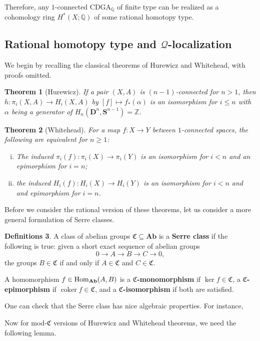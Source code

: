 \documentclass[psamsfonts]{amsart}
\newtheorem{thm}{Theorem}[section]
\theoremstyle{definition}
\newtheorem{defns}[thm]{Definitions}
\theoremstyle{remark}
\newcommand{\Q}{\mathbb{Q}}
\newcommand{\s}{\mathbf{S}}
\newcommand{\Z}{\mathbb{Z}}
\newcommand{\Ab}{\mathbf{Ab}}
\newcommand{\Hom}{\textup{Hom}}
\DeclareMathOperator{\coker}{coker}
\numberwithin{equation}{section}
\begin{document}
Therefore, any $1$-connected CDGA$_\Q$ of finite type can be realized as a cohomology ring $H^\ast(X;\Q)$ of some rational homotopy type.

\newpage
\subsection{Rational homotopy type and $\mathcal{Q}$-localization}

We begin by recalling the classical theorems of Hurewicz and Whitehead, with proofs omitted.

\begin{thm}[Hurewicz]
If a pair $(X,A)$ is $(n-1)$-connected for $n>1$, then $h:\pi_i(X,A)\to H_i(X,A)$ by $[f]\mapsto f_\ast(\alpha)$ is an isomorphism for $i\leq n$ with $\alpha$ being a generator of $H_n(\mathbf{D}^n,\s^{n-1})=\Z$.
\end{thm}

\begin{thm}[Whitehead]
For a map $f:X\to Y$ between $1$-connected spaces, the following are equivalent for $n\geq1$:\begin{enumerate}[(i)]
    \item The induced $\pi_i(f):\pi_i(X)\to\pi_i(Y)$ is an isomorphism for $i<n$ and an epimorphism for $i=n$;
    \item the induced $H_i(f):H_i(X)\to H_i(Y)$ is an isomorphism for $i<n$ and and epimorphism for $i=n$.
\end{enumerate}
\end{thm}

Before we consider the rational version of these theorems, let us consider a more general formulation of Serre classes.

\begin{defns}
A class of abelian groups $\mathfrak{C}\subseteq\Ab$ is a \textbf{Serre class} if the following is true: given a short exact sequence of abelian groups
\[0\to A\to B\to C\to0,\]
the groups $B\in\mathfrak{C}$ if and only if $A\in\mathfrak{C}$ and $C\in\mathfrak{C}$.

A homomorphism $f\in\Hom_{\Ab}(A,B)$ is a \textbf{$\mathfrak{C}$-monomorphism} if $\ker f\in\mathfrak{C}$, a \textbf{$\mathfrak{C}$-epimorphism} if $\coker f\in\mathfrak{C}$, and a \textbf{$\mathfrak{C}$-isomorphism} if both are satisfied.
\end{defns}

One can check that the Serre class has nice algebraic properties. For instance,

Now for mod-$\mathfrak{C}$ versions of Hurewicz and Whitehead theorems, we need the following lemma.
\end{document}
